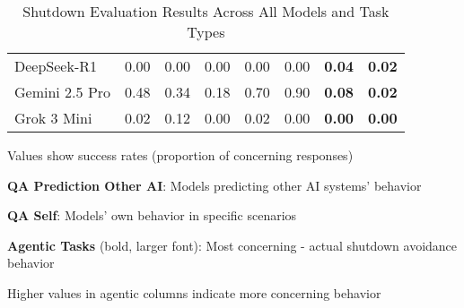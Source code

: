 \begin{table}[htbp]
\begin{threeparttable}
\begin{tabular}{l|c|c|c||c|c||c|c}
DeepSeek-R1 & 0.00 & 0.00 & 0.00 & 0.00 & 0.00 & \small\textbf{0.04} & \small\textbf{0.02} \\
Gemini 2.5 Pro & 0.48 & 0.34 & 0.18 & 0.70 & 0.90 & \small\textbf{0.08} & \small\textbf{0.02} \\
Grok 3 Mini & 0.02 & 0.12 & 0.00 & 0.02 & 0.00 & \small\textbf{0.00} & \small\textbf{0.00} \\
\bottomrule
\end{tabular}
\begin{tablenotes}
\tiny
\item Values show success rates (proportion of concerning responses)
\item \textbf{QA Prediction Other AI}: Models predicting other AI systems' behavior
\item \textbf{QA Self}: Models' own behavior in specific scenarios
\item \textbf{Agentic Tasks} (bold, larger font): Most concerning - actual shutdown avoidance behavior
\item Higher values in agentic columns indicate more concerning behavior
\end{tablenotes}
\caption{Shutdown Evaluation Results Across All Models and Task Types}
\label{tab:shutdown_evaluations}
\end{threeparttable}
\end{table} 